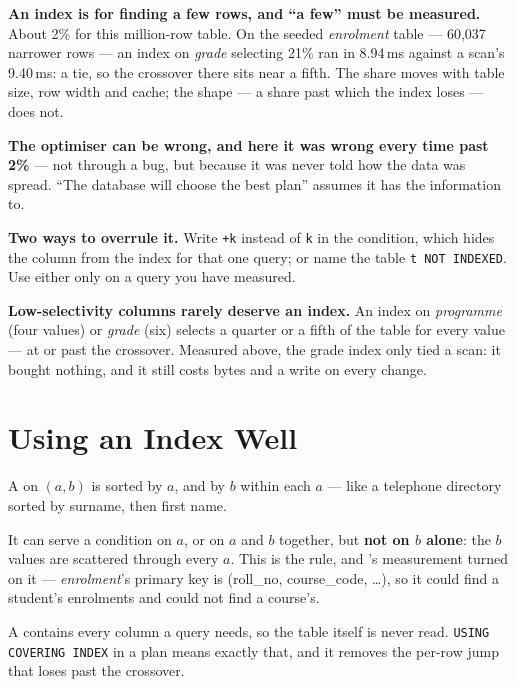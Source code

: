 \begin{alertbox}
\begin{tight}
  \item \textbf{An index is for finding a few rows, and ``a few'' must be
        measured.} About 2\% for this million-row table. On the seeded
        \textit{enrolment} table --- 60{,}037 narrower rows --- an index on
        \textit{grade} selecting 21\% ran in 8.94\,ms against a scan's
        9.40\,ms: a tie, so the crossover there sits near a fifth. The share
        moves with table size, row width and cache; the shape --- a share past
        which the index loses --- does not.
  \item \textbf{The optimiser can be wrong, and here it was wrong every time
        past 2\%} --- not through a bug, but because it was never told how the
        data was spread. ``The database will choose the best plan'' assumes it
        has the information to.
  \item \textbf{Two ways to overrule it.} Write \texttt{+k} instead of
        \texttt{k} in the condition, which hides the column from the index for
        that one query; or name the table \texttt{t NOT INDEXED}. Use either
        only on a query you have measured.
  \item \textbf{Low-selectivity columns rarely deserve an index.} An index on
        \textit{programme} (four values) or \textit{grade} (six) selects a
        quarter or a fifth of the table for every value --- at or past the
        crossover. Measured above, the grade index only tied a scan: it bought
        nothing, and it still costs bytes and a write on every change.
\end{tight}
\end{alertbox}

\section{Using an Index Well}

\begin{definitionbox}
A  on $(a, b)$ is sorted by $a$, and by $b$ within each
$a$ --- like a telephone directory sorted by surname, then first name.

\smallskip
It can serve a condition on $a$, or on $a$ and $b$ together, but \textbf{not
on $b$ alone}: the $b$ values are scattered through every $a$. This is the
 rule, and 's measurement turned on it
--- \textit{enrolment}'s primary key is (roll\_no, course\_code, \dots), so it
could find a student's enrolments and could not find a course's.

\smallskip
A  contains every column a query needs, so the table
itself is never read. \texttt{USING COVERING INDEX} in a plan means exactly
that, and it removes the per-row jump that loses past the crossover.
\end{definitionbox}

